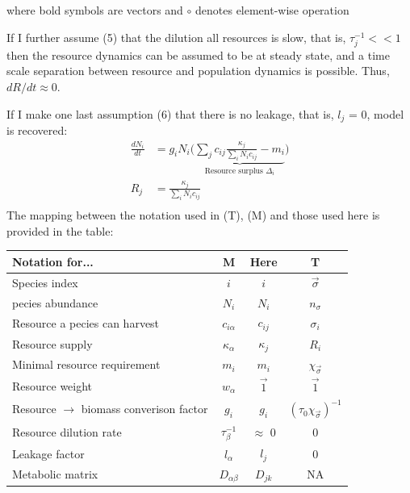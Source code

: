 \documentclass[12pt]{article}
\begin{document}
	where bold symbols are vectors and $ \circ $ denotes element-wise  operation\par
	If I further assume (5) that the dilution all resources is slow, that is, $ \tau_j^{-1} << 1$ then the resource dynamics can be assumed to be at steady state, and a time scale separation between resource and population dynamics is possible. Thus, $ dR/dt \approx 0 $.\par
	If I make one last assumption (6) that there is no leakage, that is, $ l_j $ = 0, \cite{Tikhonov2016} model is recovered:
	\begin{equation}\label{Tikhonov_model}
		\begin{aligned}
					\frac{dN_i}{dt} &= g_iN_i\Big(\underbrace{\sum_j c_{ij}\frac{\kappa_j}{\sum_iN_ic_{ij}} - m_i}_{\text{Resource surplus }\Delta_i}\Big)\\
					R_j &= \frac{\kappa_j}{\sum_iN_ic_{ij}}\\
		\end{aligned}
	\end{equation} 
	The mapping between the notation used in \cite{Tikhonov2016} (T), \cite{Marsland2019} (M) and those used here is provided in the table:\\
	\begin{center}
		\begin{tabular}{ |l|c|c|c| } 
			\hline
			Notation for... & M & Here & T \\ 
			\hline
			Species index & $ i $ & $ i $ & $\vec{\sigma}$ \\ 
			pecies abundance & $ N_i $ & $ N_i $ & $ n_{\sigma} $ \\ 
			Resource a pecies can harvest & $ c_{i\alpha} $ & $ c_{ij} $ & $ \sigma_i $ \\ 
			Resource supply & $ \kappa_{\alpha}$ & $ \kappa_j $ & $ R_i $ \\ 
			Minimal resource requirement & $ m_i $ & $ m_i $ & $ \chi_{\vec{\sigma}} $ \\ 
			Resource weight & $ w_{\alpha} $ & $ \vec{1} $ & $\vec{1}$ \\ 
			Resource $ \rightarrow $ biomass converison factor & $ g_i $ & $ g_i $ & $ (\tau_0\chi_{\vec{\sigma}})^{-1} $ \\ 
			Resource dilution rate & $ \tau_{\beta}^{-1} $ & $ \approx $ 0 & 0 \\ 
			Leakage factor & $ l_{\alpha} $ & $ l_j $ & 0 \\ 
			Metabolic matrix & $ D_{\alpha\beta} $ & $ D_{jk} $ & NA \\ 
			\hline
		\end{tabular}
	\end{center}
	
\end{document}
